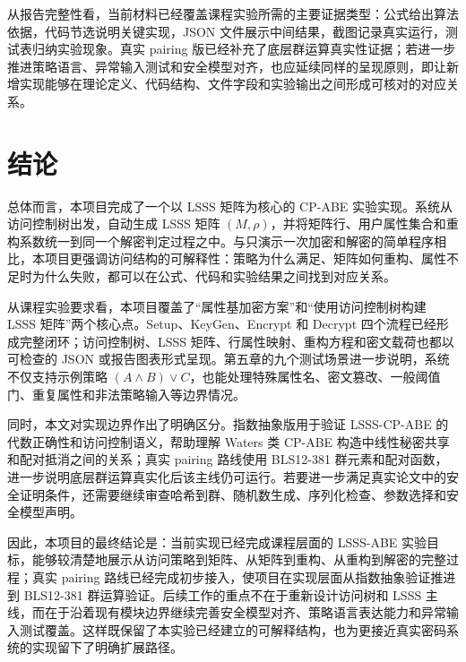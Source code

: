 从报告完整性看，当前材料已经覆盖课程实验所需的主要证据类型：公式给出算法依据，代码节选说明关键实现，JSON 文件展示中间结果，截图记录真实运行，测试表归纳实验现象。真实 pairing 版已经补充了底层群运算真实性证据；若进一步推进策略语言、异常输入测试和安全模型对齐，也应延续同样的呈现原则，即让新增实现能够在理论定义、代码结构、文件字段和实验输出之间形成可核对的对应关系。

\section{结论}

总体而言，本项目完成了一个以 LSSS 矩阵为核心的 CP-ABE 实验实现。系统从访问控制树出发，自动生成 LSSS 矩阵 $(M,\rho)$，并将矩阵行、用户属性集合和重构系数统一到同一个解密判定过程之中。与只演示一次加密和解密的简单程序相比，本项目更强调访问结构的可解释性：策略为什么满足、矩阵如何重构、属性不足时为什么失败，都可以在公式、代码和实验结果之间找到对应关系。

从课程实验要求看，本项目覆盖了“属性基加密方案”和“使用访问控制树构建 LSSS 矩阵”两个核心点。Setup、KeyGen、Encrypt 和 Decrypt 四个流程已经形成完整闭环；访问控制树、LSSS 矩阵、行属性映射、重构方程和密文载荷也都以可检查的 JSON 或报告图表形式呈现。第五章的九个测试场景进一步说明，系统不仅支持示例策略 $(A\wedge B)\vee C$，也能处理特殊属性名、密文篡改、一般阈值门、重复属性和非法策略输入等边界情况。

同时，本文对实现边界作出了明确区分。指数抽象版用于验证 LSSS-CP-ABE 的代数正确性和访问控制语义，帮助理解 Waters 类 CP-ABE 构造中线性秘密共享和配对抵消之间的关系；真实 pairing 路线使用 BLS12-381 群元素和配对函数，进一步说明底层群运算真实化后该主线仍可运行。若要进一步满足真实论文中的安全证明条件，还需要继续审查哈希到群、随机数生成、序列化检查、参数选择和安全模型声明。

因此，本项目的最终结论是：当前实现已经完成课程层面的 LSSS-ABE 实验目标，能够较清楚地展示从访问策略到矩阵、从矩阵到重构、从重构到解密的完整过程；真实 pairing 路线已经完成初步接入，使项目在实现层面从指数抽象验证推进到 BLS12-381 群运算验证。后续工作的重点不在于重新设计访问树和 LSSS 主线，而在于沿着现有模块边界继续完善安全模型对齐、策略语言表达能力和异常输入测试覆盖。这样既保留了本实验已经建立的可解释结构，也为更接近真实密码系统的实现留下了明确扩展路径。
